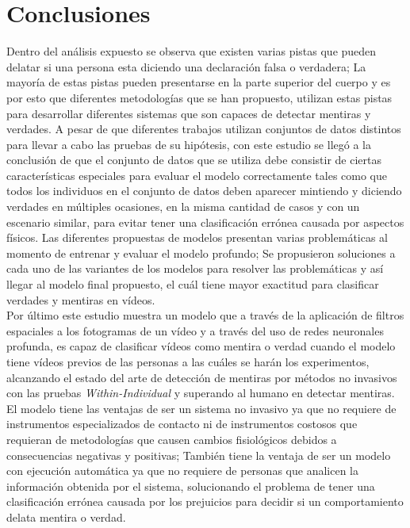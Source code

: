 \chapter{Conclusiones}

Dentro del análisis expuesto se observa que existen varias pistas que pueden delatar si una persona esta diciendo una declaración falsa o verdadera; La mayoría de estas pistas pueden presentarse en la parte superior del cuerpo y es por esto que diferentes metodologías que se han propuesto, utilizan estas pistas para desarrollar diferentes sistemas que son capaces de detectar mentiras y verdades.
A pesar de que diferentes trabajos utilizan conjuntos de datos distintos para llevar a cabo las pruebas de su hipótesis, con este estudio se llegó a la conclusión de que el conjunto de datos que se utiliza debe consistir de ciertas características especiales para evaluar el modelo correctamente tales como que todos los individuos en el conjunto de datos deben aparecer mintiendo y diciendo verdades en múltiples ocasiones, en la misma cantidad de casos y con un escenario similar, para evitar tener una clasificación errónea causada por aspectos físicos. Las diferentes propuestas de modelos presentan varias problemáticas al momento de entrenar y evaluar el modelo profundo; Se propusieron soluciones a cada uno de las variantes de los modelos para resolver las problemáticas y así llegar al modelo final propuesto, el cuál tiene mayor exactitud para clasificar verdades y mentiras en vídeos.\\

Por último este estudio muestra un modelo que a través de la aplicación de filtros espaciales a los fotogramas de un vídeo y a través del uso de redes neuronales profunda, es capaz de clasificar vídeos como mentira o verdad cuando el modelo tiene vídeos previos de las personas a las cuáles se harán los experimentos, alcanzando el estado del arte de detección de mentiras por métodos no invasivos con las pruebas \textit{Within-Individual} y superando al humano en detectar mentiras.
El modelo tiene las ventajas de ser un sistema no invasivo ya que no requiere de instrumentos especializados de contacto ni de instrumentos costosos que requieran de metodologías que causen cambios fisiológicos debidos a consecuencias negativas y positivas; También tiene la ventaja de ser un modelo con ejecución automática ya que no requiere de personas que analicen la información obtenida por el sistema, solucionando el problema de tener una clasificación errónea causada por los prejuicios para decidir si un comportamiento delata mentira o verdad.